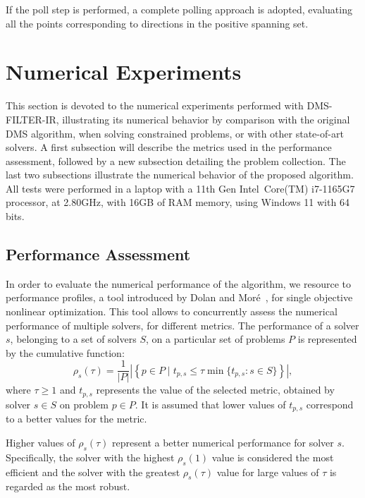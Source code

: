 \documentclass[12pt]{article}
\newcommand{\set}[1]{\{#1\}}
\begin{document}
If the poll step is performed, a complete polling approach is
adopted, evaluating all the points corresponding to directions in
the positive spanning set.


\section{Numerical Experiments}
\label{sec:numerical_experiments} This section is devoted to the
numerical experiments performed with DMS-FILTER-IR, illustrating
its numerical behavior by comparison with the original DMS
algorithm, when solving constrained problems, or with other
state-of-art solvers. A first subsection will describe the metrics
used in the performance assessment, followed by a new subsection
detailing the problem collection. The last two subsections
illustrate the numerical behavior of the proposed algorithm. All
tests were performed in a laptop with a 11th Gen
Intel{\small\textregistered}\ Core(TM) i7-1165G7 processor, at
2.80GHz, with 16GB of RAM memory, using Windows 11 with 64 bits.

\subsection{Performance Assessment}

In order to evaluate the numerical performance of the algorithm,
we resource to performance profiles, a tool introduced by Dolan
and Mor\'e~\cite{Dolan_More_2002}, for single objective nonlinear
optimization. This tool allows to concurrently assess the
numerical performance of multiple solvers, for different metrics.
The performance of a solver $s$, belonging to a set of solvers
$S$, on a particular set of problems $P$ is represented by the
cumulative function:
\begin{equation*}
\rho_s(\tau)=\dfrac{1}{|P|}\left|\left\{p\in P\mid t_{p,s}\leq
\tau \min\set{t_{p,s}: s\in S}\right\}\right|,
\end{equation*}
where $\tau\geq 1$ and $t_{p,s}$ represents the value of the
selected metric, obtained by solver $s\in S$ on problem $p\in P$.
It is assumed that lower values of $ t_{p,s}$ correspond to a
better values for the metric.

Higher values of $\rho_s(\tau)$ represent a better numerical
performance for solver $s$. Specifically, the solver with the
highest $\rho_s(1)$ value is considered the most efficient and the
solver with the greatest $\rho_s(\tau)$ value for large values of
$\tau$ is regarded as the most robust.
\end{document}
